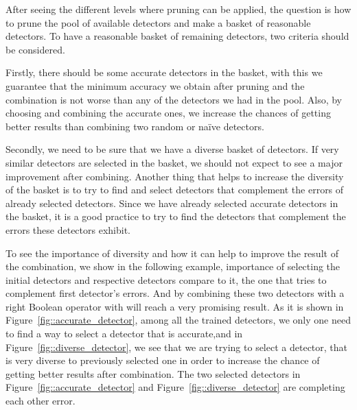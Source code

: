 After seeing the different levels where pruning can be applied, the question is how to prune the pool of available detectors and make a basket of reasonable detectors. To have a reasonable basket of remaining detectors, two criteria should be considered.  

Firstly, there should be some accurate detectors in the basket, with this we guarantee that the minimum accuracy we obtain after pruning and the combination is not worse than any of the detectors we had in the pool. Also, by choosing and combining the accurate ones, we increase the chances of getting better results than combining two random or naïve detectors.  

Secondly, we need to be sure that we have a diverse basket of detectors. If very similar detectors  are selected  in the basket, we should not expect to see a major improvement after combining. Another thing that helps to increase the diversity of the basket is to try to find and select detectors that complement the errors of already selected detectors. Since we have already selected accurate detectors in the basket, it is a good practice to try to find the detectors that complement the errors these detectors exhibit. 

To see the importance of diversity and how it can help to improve the result of the combination, we show in the following example, importance of selecting the initial detectors and respective detectors compare to it, the one that tries to complement first detector's errors. And by combining these two detectors with a right Boolean operator with will reach a very promising result. As it is shown in Figure~\ref{fig::accurate_detector}, among all the trained detectors, we only one need to find a way to select a detector that is accurate,and in Figure~\ref{fig::diverse_detector}, we see that we are trying to select a detector, that is very diverse to previously selected one in order to increase the chance of getting better results after combination. The two selected detectors in Figure~\ref{fig::accurate_detector} and Figure~\ref{fig::diverse_detector} are completing each other error.


